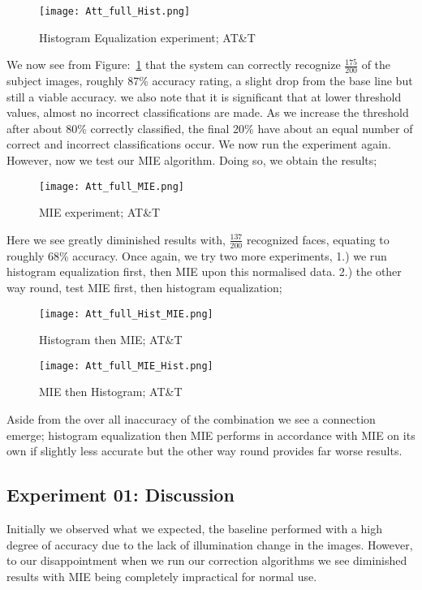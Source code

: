 	\begin{figure}[H]
		\centering
		\caption{Histogram Equalization experiment; AT\&T \label{fig:Att_Hist_exp}}
		\texttt{[image: Att\_full\_Hist.png]}
	\end{figure}
	
We now see from Figure:~\ref{fig:Att_Hist_exp} that the system can correctly recognize $\frac{175}{200}$ of the subject images,
roughly 87\% accuracy rating, a slight drop from the base line but still a viable accuracy.  we also note that it is significant 
that at lower threshold values, almost no incorrect classifications are made.  As we increase the threshold after about 80\% 
correctly classified, the final 20\% have about an equal number of correct and incorrect classifications occur.  
We now run the experiment again.  However, now we test our MIE algorithm.  Doing so, we obtain the results;

	\begin{figure}[H]
		\centering
		\caption{MIE experiment; AT\&T \label{fig:Att_MIE_exp}}
		\texttt{[image: Att\_full\_MIE.png]}
	\end{figure}

Here we see greatly diminished results with, $\frac{137}{200}$ recognized faces, equating to roughly 68\% accuracy.  Once again, 
we try two more experiments, 1.) we run histogram equalization first, then MIE upon this normalised data. 2.) the other way round, 
test MIE first, then histogram equalization;
 
 	\begin{figure}[H]
		\centering
		\caption{Histogram then MIE; AT\&T \label{fig:Att_Hist_MIE_exp}}
		\texttt{[image: Att\_full\_Hist\_MIE.png]}
	\end{figure}
	
   	\begin{figure}[H]
		\centering
		\caption{MIE then Histogram; AT\&T \label{fig:Att_MIE_Hist_exp}}
		\texttt{[image: Att\_full\_MIE\_Hist.png]}
	\end{figure}
  
Aside from the over all inaccuracy of the combination we see a connection emerge; histogram equalization then MIE performs 
in accordance with MIE on its own if slightly less accurate but the other way round provides far worse results.

\subsection{Experiment 01: Discussion}
Initially we observed what we expected, the baseline performed with a high degree of accuracy due to the lack of illumination 
change in the images.  However, to our disappointment when we run our correction algorithms we see diminished results with 
MIE being completely impractical for normal use.  \\


